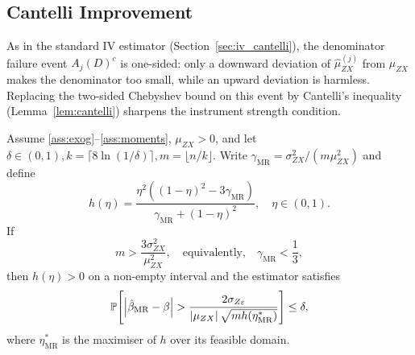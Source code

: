 \subsection{Cantelli Improvement}
\label{sec:mor_cantelli}

As in the standard IV estimator (Section~\ref{sec:iv_cantelli}), the denominator failure event $A_j(D)^c$ is one-sided: only a downward deviation of $\hat{\mu}_{ZX}^{(j)}$ from $\mu_{ZX}$ makes the denominator too small, while an upward deviation is harmless. Replacing the two-sided Chebyshev bound on this event by Cantelli's inequality (Lemma~\ref{lem:cantelli}) sharpens the instrument strength condition.


\begin{theorem}
\label{thm:mor_cantelli}
    Assume \ref{ass:exog}--\ref{ass:moments}, $\mu_{ZX}>0$, and let $\delta \in (0,1), k = \lceil 8\ln{(1/\delta)} \rceil, m=\lfloor n/k\rfloor$. Write $\gamma_{\mathrm{MR}} = \sigma_{ZX}^2/(m\mu_{ZX}^2)$ and define
    \begin{equation}
    \label{eq:h_eta_mor}
        h(\eta) = \frac{\eta^2((1-\eta)^2 - 3\gamma_\mathrm{MR})}{\gamma_\mathrm{MR}+(1-\eta)^2},
        \quad \eta\in(0,1).
    \end{equation}
    If
    \begin{equation}
    \label{eq:mor_cantelli_strength}
        m > \frac{3\sigma_{ZX}^2}{\mu_{ZX}^2}, \quad\text{equivalently,}\quad \gamma_{\mathrm{MR}} < \frac{1}{3},
    \end{equation}
    then $h(\eta)>0$ on a non-empty interval and the estimator satisfies
    \begin{equation}
    \label{eq:mor_cantelli_bound}
        \operatorname{\mathbb{P}}\!\left[\left|\hat{\beta}_{\mathrm{MR}} - \beta\right|
            > \frac{2\sigma_{Z\varepsilon}}{\left|\mu_{ZX}\right|\sqrt{mh(\eta^*_{\mathrm{MR}})}}
            \right] \leq \delta,
    \end{equation}
    where $\eta^*_{\mathrm{MR}}$ is the maximiser of $h$ over its feasible domain.
\end{theorem}

